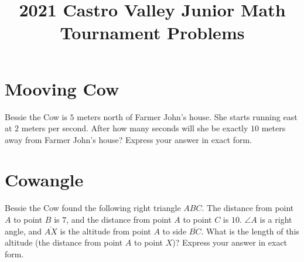 \documentclass{article}
\title{2021 Castro Valley Junior Math Tournament Problems}
\author{}
\date{}
\begin{document}
\maketitle

\section*{Mooving Cow}
Bessie the Cow is $5$ meters north of Farmer John's house.
She starts running east at $2$ meters per second.
After how many seconds will she be exactly $10$ meters away from Farmer John's house?
Express your answer in exact form.

\section*{Cowangle}
\begin{figure}
	\vspace{-20pt}
	\centering
	\vspace{-20pt}
\end{figure}
Bessie the Cow found the following right triangle $ABC$.
The distance from point $A$ to point $B$ is $7$, and the distance from point $A$ to point $C$ is $10$.
$\angle A$ is a right angle, and $\overline{AX}$ is the altitude from point $A$ to side $\overline{BC}$.
What is the length of this altitude (the distance from point $A$ to point $X$)?
Express your answer in exact form.
\end{document}
